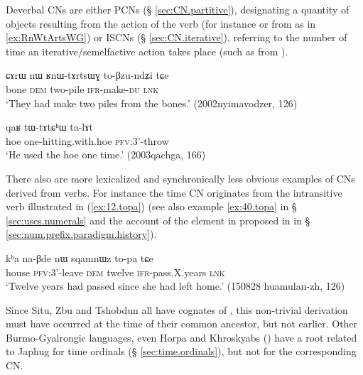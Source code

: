 Deverbal CNs are either PCNs (§ \ref{sec:CN.partitive}), designating a quantity of objects resulting from the action of the verb (for instance  or  from  as in \ref{ex:RnWtArtsWG}) or ISCNs (§ \ref{sec:CN.iterative}), referring to the number of time an iterative/semelfactive action takes place (such as  from ).

\begin{exe}
\ex \label{ex:RnWtArtsWG}
\gll ɕɤrɯ nɯ ʁnɯ-tɤrtsɯɣ to-βzu-ndʑi tɕe \\
bone \textsc{dem} two-pile \textsc{ifr}-make-\textsc{du} \textsc{lnk} \\
\glt `They had make two piles from the bones.' (2002nyimavodzer, 126)
\end{exe}

\begin{exe}
\ex \label{ex:tWtAtChW}
\gll qaʁ tɯ-tɤtɕʰɯ ta-lɤt  \\
hoe one-hitting.with.hoe \textsc{pfv}:3'-throw \\
\glt `He used the hoe one time.' (2003qachga, 166)
\end{exe}

There also are more lexicalized and synchronically less obvious examples of CNs derived from verbs. For instance the time CN  originates from the intransitive verb   illustrated in (\ref{ex:12.topa}) (see also example \ref{ex:40.topa}  in 
§ \ref {sec:uses.numerals} and the account of the  element in  proposed in in § \ref{sec:num.prefix.paradigm.history}). 

\begin{exe}
\ex \label{ex:12.topa} 
\gll kʰa na-βde nɯ sqamnɯz to-pa tɕe \\ 
house \textsc{pfv}:3'-leave \textsc{dem} twelve  \textsc{ifr}-pass.X.years \textsc{lnk} \\
\glt `Twelve years had passed since she had left home.' (150828 huamulan-zh, 126)
\end{exe}

Since Situ, Zbu and Tshobdun all have cognates of , this non-trivial derivation must have occurred at the time of their common ancestor, but not earlier. Other Burmo-Gyalrongic languages, even Horpa and Khroskyabs (\citealt{jacques17stau}) have a root related to Japhug  for time ordinals (§ \ref{sec:time.ordinals}), but not for the corresponding CN. 
 
